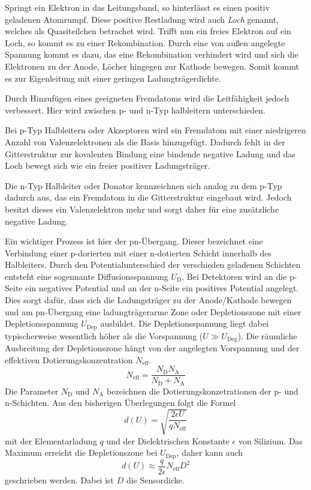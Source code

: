  Springt ein Elektron in das Leitungsband, so hinterlässt es einen positiv
 geladenen Atomrumpf. Diese positive Restladung wird auch \textit{Loch} genannt,
 welches als Quasiteilchen betrachet wird. Trifft nun ein freies Elektron auf ein
 Loch, so kommt es zu einer Rekombination. Durch eine von außen angelegte Spannung
 kommt es dazu, das eine Rekombination verhindert wird und sich die Elektronen
 zu der Anode, Löcher hingegen zur Kathode bewegen. Somit kommt es zur Eigenleitung
 mit einer geringen Ladungträgerdichte.

 Durch Hinzufügen eines geeigneten Fremdatoms wird die Leitfähigkeit jedoch verbessert.
 Hier wird zwischen p- und n-Typ halbleitern unterschieden.

 Bei p-Typ Halbleitern oder Akzeptoren wird ein Fremdatom mit einer niedrigeren
 Anzahl von Valenzelektronen als die Basis
 hinzugefügt. Dadurch fehlt in der Gitterstruktur zur kovalenten
 Bindung eine bindende negative Ladung und das Loch bewegt sich wie ein freier
 positiver Ladungsträger.

 Die n-Typ Halbleiter oder Donator kennzeichnen sich analog zu dem p-Typ dadurch aus, das ein
 Fremdatom in die Gitterstruktur eingebaut wird. Jedoch besitzt dieses ein
 Valenzelektron mehr und sorgt daher für eine zusätzliche negative Ladung.

 Ein wichtiger Prozess ist hier der pn-Übergang. Dieser bezeichnet eine Verbindung
 einer p-dorierten mit einer n-dotierten Schicht innerhalb des Halbleiters. Durch den
 Potentialunterschied der verschieden geladenen Schichten entsteht eine sogennante
 Diffusionsspannung $U_\text{D}$. Bei Detektoren wird an die p-Seite ein negatives
 Potential und an der n-Seite ein positives Potential angelegt. Dies sorgt dafür,
 dass sich die Ladungsträger zu der Anode/Kathode bewegen und am pn-Übergang eine
 ladungträgerarme Zone oder Depletionszone mit einer Depletionsspannung $U_\text{Dep}$
 ausbildet. Die Depletionsspannung liegt dabei typischerweise wesentlich höher als die
 Vorspannung ($U \gg U_\text{Deg}$). Die räumliche Ausbreitung der Depletionszone
 hängt von der angelegten Vorspannung und der effektiven Dotierungskonzentration
 $N_\text{eff}$.
 \begin{equation}
   N_\text{eff} = \frac{N_\text{D}N_\text{A}}{N_\text{D}+N_\text{A}}
 \end{equation}
Die Parameter $N_\text{D}$ und $N_\text{A}$ bezeichnen die Dotierungskonzetrationen
der p- und n-Schichten.
Aus den bisherigen Überlegungen folgt die Formel
\begin{equation}
  d(U) = \sqrt{\frac{2\epsilon U}{q N_\text{eff}}}
\end{equation}
mit der Elementarladung $q$ und der Dielektrischen Konstante $\epsilon$ von
Silizium. Das Maximum erreicht die Depletionszone bei $U_\text{Dep}$, daher kann
auch
\begin{equation}
  d(U) \approx \frac{q}{2\epsilon} N_\text{eff}D^2
\end{equation}
geschrieben werden. Dabei ist $D$ die Sensordicke.

